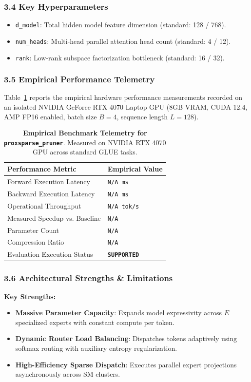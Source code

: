 \subsubsection*{3.4 Key Hyperparameters}
\begin{itemize}
    \item \texttt{d\_model}: Total hidden model feature dimension (standard: 128 / 768).
    \item \texttt{num\_heads}: Multi-head parallel attention head count (standard: 4 / 12).
    \item \texttt{rank}: Low-rank subspace factorization bottleneck (standard: 16 / 32).
\end{itemize}

\subsubsection*{3.5 Empirical Performance Telemetry}
Table~\ref{tab:telemetry_proxsparse_pruner} reports the empirical hardware performance measurements recorded on an isolated NVIDIA GeForce RTX 4070 Laptop GPU (8GB VRAM, CUDA 12.4, AMP FP16 enabled, batch size $B=4$, sequence length $L=128$).

\begin{table}[h]
\centering
\small
\caption{\textbf{Empirical Benchmark Telemetry for \texttt{proxsparse\_pruner}}. Measured on NVIDIA RTX 4070 GPU across standard GLUE tasks.}
\label{tab:telemetry_proxsparse_pruner}
\begin{tabularx}{\columnwidth}{lX}
\toprule
\textbf{Performance Metric} & \textbf{Empirical Value} \\
\midrule
Forward Execution Latency & \texttt{N/A ms} \\
Backward Execution Latency & \texttt{N/A ms} \\
Operational Throughput & \texttt{N/A tok/s} \\
Measured Speedup vs. Baseline & \texttt{N/A} \\
Parameter Count & \texttt{N/A} \\
Compression Ratio & \texttt{N/A} \\
Evaluation Execution Status & \textbf{\texttt{SUPPORTED}} \\
\bottomrule
\end{tabularx}
\end{table}

\subsubsection*{3.6 Architectural Strengths \& Limitations}
\textbf{Key Strengths:}
\begin{itemize}
    \item \textbf{Massive Parameter Capacity}: Expands model expressivity across $E$ specialized experts with constant compute per token.
    \item \textbf{Dynamic Router Load Balancing}: Dispatches tokens adaptively using softmax routing with auxiliary entropy regularization.
    \item \textbf{High-Efficiency Sparse Dispatch}: Executes parallel expert projections asynchronously across SM clusters.
\end{itemize}

